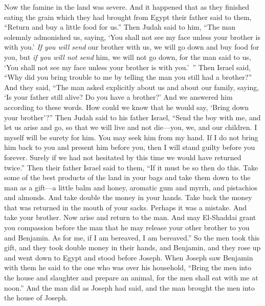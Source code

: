 \begin{biblechapter} %
 Now the famine in the land was severe.
\verse And it happened that as they finished eating the grain which they had brought from Egypt their father said to them, “Return and buy a little food for us.”
\verse Then Judah said to him, “The man solemnly admonished us, saying, ‘You shall not see my face unless your brother is with you.’
\verse \textit{If you will send} our brother with us, we will go down and buy food for you,
\verse but \textit{if you will not send} him, we will not go down, for the man said to us, ‘You shall not see my face unless your brother is with you.’ ”
\verse Then Israel said, “Why did you bring trouble to me by telling the man you still had a brother?”
\verse And they said, “The man asked explicitly about us and about our family, saying, ‘Is your father still alive? Do you have a brother?’ And we answered him according to these words. How could we know that he would say, ‘Bring down your brother’?”
\verse Then Judah said to his father Israel, “Send the boy with me, and let us arise and go, so that we will live and not die—you, we, and our children.
\verse I myself will be surety for him. You may seek him from my hand. If I do not bring him back to you and present him before you, then I will stand guilty before you forever.
\verse Surely if we had not hesitated by this time we would have returned twice.”
\verse Then their father Israel said to them, “If it must be so then do this. Take some of the best products of the land in your bags and take them down to the man as a gift—a little balm and honey, aromatic gum and myrrh, and pistachios and almonds.
\verse And take double the money in your hands. Take back the money that was returned in the mouth of your sacks. Perhaps it was a mistake.
\verse And take your brother. Now arise and return to the man.
\verse And may El-Shaddai grant you compassion before the man that he may release your other brother to you and Benjamin. As for me, if I am bereaved, I am bereaved.”
\verse So the men took this gift, and they took double money in their hands, and Benjamin, and they rose up and went down to Egypt and stood before Joseph.
\verse When Joseph saw Benjamin with them he said to the one who was over his household, “Bring the men into the house and slaughter and prepare an animal, for the men shall eat with me at noon.”
\verse And the man did as Joseph had said, and the man brought the men into the house of Joseph.

\end{biblechapter}
